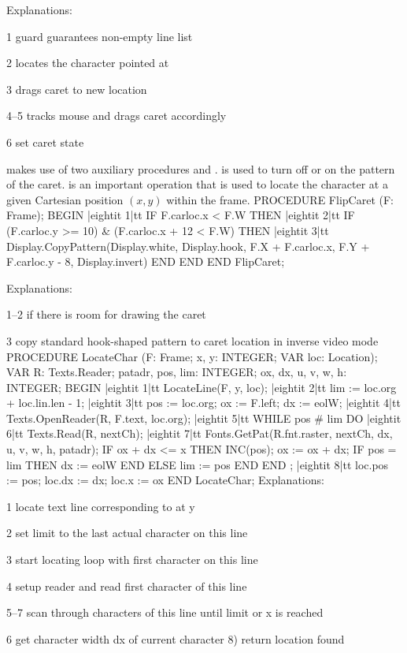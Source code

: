 \noindent Explanations:

\item{1} guard guarantees non-empty line list
\item{2} locates the character pointed at
\item{3} drags caret to new location
\item{4--5} tracks mouse and drags caret accordingly
\item{6} set caret state

\noindent{} makes use of two auxiliary procedures  and .  is used to turn off or on the pattern of the caret.  is an important operation that is used to locate the character at a given Cartesian position $(x, y)$ within the frame.
\begintt
PROCEDURE FlipCaret (F: Frame);
BEGIN
|eightit 1|tt IF F.carloc.x < F.W THEN
|eightit 2|tt  IF (F.carloc.y >= 10) & (F.carloc.x + 12 < F.W) THEN
|eightit 3|tt    Display.CopyPattern(Display.white, Display.hook,
        F.X + F.carloc.x, F.Y + F.carloc.y - 8, Display.invert)
    END
  END
END FlipCaret;
\endtt

\noindent Explanations:

\item{1--2} if there is room for drawing the caret
\item{3} copy standard hook-shaped pattern to caret location in inverse video mode
\begintt
PROCEDURE LocateChar (F: Frame; x, y: INTEGER; VAR loc: Location);
VAR R: Texts.Reader;
    patadr, pos, lim: INTEGER;
    ox, dx, u, v, w, h: INTEGER;
BEGIN
|eightit 1|tt LocateLine(F, y, loc);
|eightit 2|tt lim := loc.org + loc.lin.len - 1;
|eightit 3|tt pos := loc.org; ox := F.left; dx := eolW;
|eightit 4|tt Texts.OpenReader(R, F.text, loc.org);
|eightit 5|tt WHILE pos # lim DO
|eightit 6|tt   Texts.Read(R, nextCh);
|eightit 7|tt   Fonts.GetPat(R.fnt.raster, nextCh, dx, u, v, w, h, patadr);
    IF ox + dx <= x THEN
      INC(pos); ox := ox + dx;
      IF pos = lim THEN dx := eolW END
      ELSE lim := pos
    END
  END ;
|eightit 8|tt loc.pos := pos; loc.dx := dx; loc.x := ox
END LocateChar;
\endtt
\noindent Explanations:

\item{1} locate text line corresponding to at y
\item{2} set limit to the last actual character on this line
\item{3} start locating loop with first character on this line
\item{4} setup reader and read first character of this line
\item{5--7} scan through characters of this line until limit or x is reached
\item{6} get character width dx of current character 8) return location found

